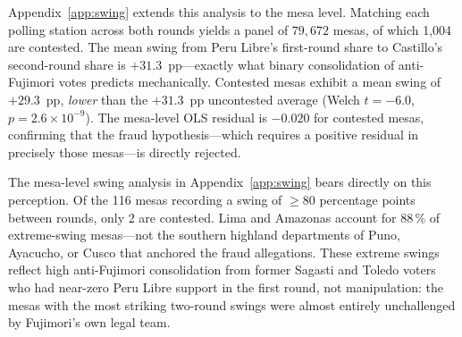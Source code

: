 

Appendix~\ref{app:swing} extends this analysis to the mesa level.
Matching each polling station across both rounds yields a panel of
$79{,}672$ mesas, of which 1,004 are contested.
The mean swing from Peru Libre's first-round share to Castillo's
second-round share is $+31.3$~pp---exactly what binary consolidation
of anti-Fujimori votes predicts mechanically.
Contested mesas exhibit a mean swing of $+29.3$~pp, \emph{lower} than
the $+31.3$~pp uncontested average (Welch $t = -6.0$,
$p = 2.6 \times 10^{-9}$).
The mesa-level OLS residual is $-0.020$ for contested mesas,
confirming that the fraud hypothesis---which requires a positive residual
in precisely those mesas---is directly rejected.



The mesa-level swing analysis in Appendix~\ref{app:swing} bears directly
on this perception.
Of the 116 mesas recording a swing of $\geq 80$ percentage points
between rounds, only 2 are contested.
Lima and Amazonas account for 88\,\% of extreme-swing mesas---not the
southern highland departments of Puno, Ayacucho, or Cusco that anchored
the fraud allegations.
These extreme swings reflect high anti-Fujimori consolidation from former
Sagasti and Toledo voters who had near-zero Peru Libre support in the first
round, not manipulation: the mesas with the most striking two-round swings
were almost entirely unchallenged by Fujimori's own legal team.
